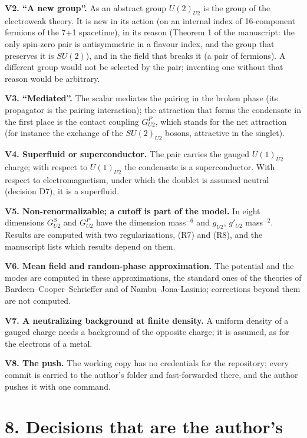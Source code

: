 \documentclass[
  10pt,
]{article}
\begin{document}
\textbf{V2. ``A new group''.} As an abstract group \(U(2)_{U2}\) is the
group of the electroweak theory. It is new in its action (on an internal
index of 16-component fermions of the 7+1 spacetime), in its reason
(Theorem 1 of the manuscript: the only spin-zero pair is antisymmetric
in a flavour index, and the group that preserves it is \(SU(2)\)), and
in the field that breaks it (a pair of fermions). A different group
would not be selected by the pair; inventing one without that reason
would be arbitrary.

\textbf{V3. ``Mediated''.} The scalar mediates the pairing in the broken
phase (its propagator is the pairing interaction); the attraction that
forms the condensate in the first place is the contact coupling
\(G^P_{U2}\), which stands for the net attraction (for instance the
exchange of the \(SU(2)_{U2}\) bosons, attractive in the singlet).

\textbf{V4. Superfluid or superconductor.} The pair carries the gauged
\(U(1)_{U2}\) charge; with respect to \(U(1)_{U2}\) the condensate is a
superconductor. With respect to electromagnetism, under which the
doublet is assumed neutral (decision D7), it is a superfluid.

\textbf{V5. Non-renormalizable; a cutoff is part of the model.} In eight
dimensions \(G^S_{U2}\) and \(G^P_{U2}\) have the dimension
mass\(^{-6}\) and \(g_{U2}\), \(g'_{U2}\) mass\(^{-2}\). Results are
computed with two regularizations, (R7) and (R8), and the manuscript
lists which results depend on them.

\textbf{V6. Mean field and random-phase approximation.} The potential
and the modes are computed in these approximations, the standard ones of
the theories of Bardeen--Cooper--Schrieffer and of Nambu--Jona-Lasinio;
corrections beyond them are not computed.

\textbf{V7. A neutralizing background at finite density.} A uniform
density of a gauged charge needs a background of the opposite charge; it
is assumed, as for the electrons of a metal.

\textbf{V8. The push.} The working copy has no credentials for the
repository; every commit is carried to the author's folder and
fast-forwarded there, and the author pushes it with one command.

\hypertarget{decisions-that-are-the-authors}{%
\section{8. Decisions that are the
author's}\label{decisions-that-are-the-authors}}
\end{document}
